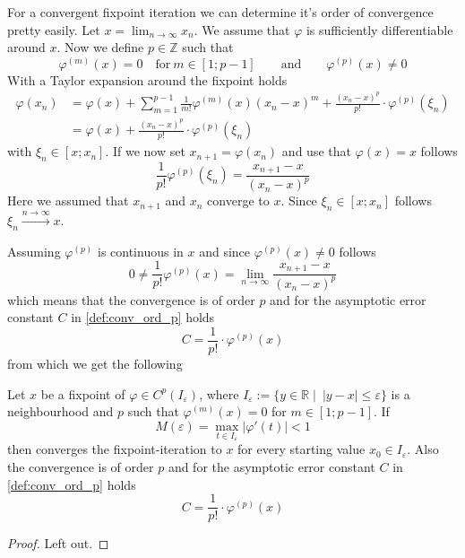 For a convergent fixpoint iteration we can determine it's order of convergence pretty easily.
Let \(x = \lim_{n \to \infty} x_n\).
We assume that \(\varphi\) is sufficiently differentiable around \(x\).
Now we define \(p \in \mathbb{Z}\) such that
\[\varphi^{(m)}(x) = 0 \quad\text{for}~m \in [1; p-1] \qquad\text{and}\qquad \varphi^{(p)}(x) \neq 0\]
With a Taylor expansion around the fixpoint holds
\begin{equation*}
   \begin{split}
      \varphi(x_n) & = \varphi(x) + \sum_{m=1}^{p-1} \frac{1}{m!} \varphi^{(m)}(x) (x_n - x)^m + \frac{(x_n - x)^p}{p!} \cdot \varphi^{(p)}(\xi_n)\\
                   & = \varphi(x) + \frac{(x_n - x)^p}{p!} \cdot \varphi^{(p)}(\xi_n)
   \end{split}
\end{equation*}
with \(\xi_n \in [x; x_n]\).
If we now set \(x_{n+1} = \varphi(x_n)\) and use that \(\varphi(x) = x\) follows
\[\frac{1}{p!} \varphi^{(p)}(\xi_n) = \frac{x_{n+1} - x}{(x_n - x)^p}\]
Here we assumed that \(x_{n+1}\) and \(x_n\) converge to \(x\).
Since \(\xi_n \in [x; x_n]\) follows \(\xi_n \xrightarrow{n \to \infty} x\).

Assuming \(\varphi^{(p)}\) is continuous in \(x\) and since \(\varphi^{(p)}(x) \neq 0\) follows
\[0 \neq \frac{1}{p!}\varphi^{(p)}(x) = \lim_{n \to \infty} \frac{x_{n+1} - x}{(x_n - x)^p}\]
which means that the convergence is of order \(p\) and for the asymptotic error constant \(C\) in \cref{def:conv_ord_p} holds
\[C = \frac{1}{p!} \cdot \varphi^{(p)}(x)\]
from which we get the following

\begin{theorem}
   Let \(x\) be a fixpoint of \(\varphi \in C^p(I_\varepsilon)\), where \(I_\varepsilon := \{y \in \mathbb{R} \mid~|y - x| \leq \varepsilon\}\) is a neighbourhood and \(p\) such that \(\varphi^{(m)}(x) = 0\) for \(m \in [1; p-1]\).
   If
   \[M(\varepsilon) = \max_{t \in I_\varepsilon} |\varphi'(t)| < 1\]
   then converges the fixpoint-iteration to \(x\) for every starting value \(x_0 \in I_\varepsilon\).
   Also the convergence is of order \(p\) and for the asymptotic error constant \(C\) in \cref{def:conv_ord_p} holds
   \[C = \frac{1}{p!} \cdot \varphi^{(p)}(x)\]
\end{theorem}
\begin{proof}
   Left out.
\end{proof}



